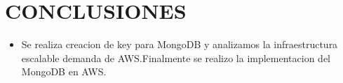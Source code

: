\documentclass[12pt,letterpaper]{article}
\begin{document}
\begin{enumerate}
\begin{enumerate}
	
		\end{enumerate}
		
	\section{CONCLUSIONES}
	\begin{itemize}
			\item Se realiza creacion de key para MongoDB y analizamos la infraestructura escalable demanda de AWS.Finalmente se realizo la implementacion del MongoDB en AWS.
			
		\end{itemize}
		
		
	
\end{document}
